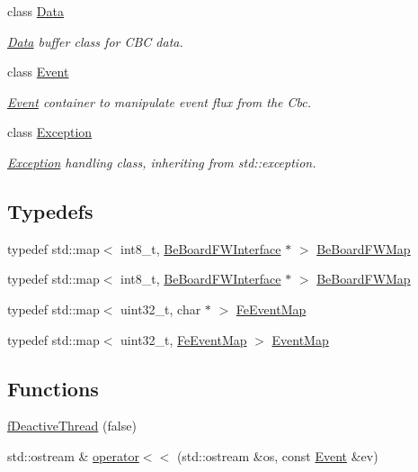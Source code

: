 \begin{CompactItemize}
class \hyperlink{class_ph2___hw_interface_1_1_data}{Data}
\begin{CompactList}\small\item\em \hyperlink{class_ph2___hw_interface_1_1_data}{Data} buffer class for CBC data. \item\end{CompactList}\item 
class \hyperlink{class_ph2___hw_interface_1_1_event}{Event}
\begin{CompactList}\small\item\em \hyperlink{class_ph2___hw_interface_1_1_event}{Event} container to manipulate event flux from the Cbc. \item\end{CompactList}\item 
class \hyperlink{class_ph2___hw_interface_1_1_exception}{Exception}
\begin{CompactList}\small\item\em \hyperlink{class_ph2___hw_interface_1_1_exception}{Exception} handling class, inheriting from std::exception. \item\end{CompactList}\end{CompactItemize}
\subsection*{Typedefs}
\begin{CompactItemize}
\item 
typedef std::map$<$ int8\_\-t, \hyperlink{class_ph2___hw_interface_1_1_be_board_f_w_interface}{Be\-Board\-FWInterface} $\ast$ $>$ \hyperlink{namespace_ph2___hw_interface_59fe3165f25ded62b5b12cf0ebc69e8d}{Be\-Board\-FWMap}
\item 
typedef std::map$<$ int8\_\-t, \hyperlink{class_ph2___hw_interface_1_1_be_board_f_w_interface}{Be\-Board\-FWInterface} $\ast$ $>$ \hyperlink{namespace_ph2___hw_interface_59fe3165f25ded62b5b12cf0ebc69e8d}{Be\-Board\-FWMap}
\item 
typedef std::map$<$ uint32\_\-t, char $\ast$ $>$ \hyperlink{namespace_ph2___hw_interface_50d97ee46941c2c0c2ecadc929e41b05}{Fe\-Event\-Map}
\item 
typedef std::map$<$ uint32\_\-t, \hyperlink{namespace_ph2___hw_interface_50d97ee46941c2c0c2ecadc929e41b05}{Fe\-Event\-Map} $>$ \hyperlink{namespace_ph2___hw_interface_cf9f41d647e7a3ad9bae233b04b9e3bc}{Event\-Map}
\end{CompactItemize}
\subsection*{Functions}
\begin{CompactItemize}
\item 
\hyperlink{namespace_ph2___hw_interface_45c84dee08a5b37d565bbcd5eeab2b4d}{f\-Deactive\-Thread} (false)
\item 
std::ostream \& \hyperlink{namespace_ph2___hw_interface_1ac2256abcd1c8a18fe02161b3735c80}{operator$<$$<$} (std::ostream \&os, const \hyperlink{class_ph2___hw_interface_1_1_event}{Event} \&ev)
\end{CompactItemize}


